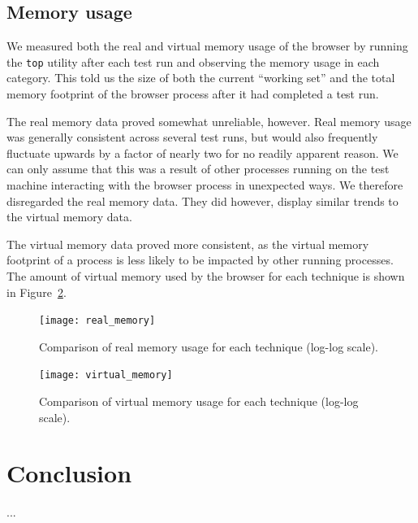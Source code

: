 \documentclass[acmtocl,acmnow]{acmtrans2m}
\begin{document}
\subsection{Memory usage}

We measured both the real and virtual memory usage of the browser by
running the \texttt{top} utility after each test run and observing the
memory usage in each category. This told us the size of both the current
``working set'' and the total memory footprint of the browser process
after it had completed a test run.


The real memory data proved somewhat unreliable, however. Real memory
usage was generally consistent across several test runs, but would also
frequently fluctuate upwards by a factor of nearly two for no readily
apparent reason. We can only assume that this was a result of other
processes running on the test machine interacting with the browser
process in unexpected ways. We therefore disregarded the real memory
data. They did however, display similar trends to the virtual memory
data.

The virtual memory data proved more consistent, as the virtual memory
footprint of a process is less likely to be impacted by other running
processes. The amount of virtual memory used by the browser for each
technique is shown in Figure~\ref{fig-virtual-memory}.


\begin{figure}
	\centering
	\texttt{[image: real\_memory]}
	\caption{Comparison of real memory usage for each technique (log-log scale).}
	\label{fig-real-memory}
\end{figure}


\begin{figure}
	\centering
	\texttt{[image: virtual\_memory]}
	\caption{Comparison of virtual memory usage for each technique (log-log scale).}
	\label{fig-virtual-memory}
\end{figure}


\section{Conclusion}








\begin{received}
...
\end{received}
\end{document}

